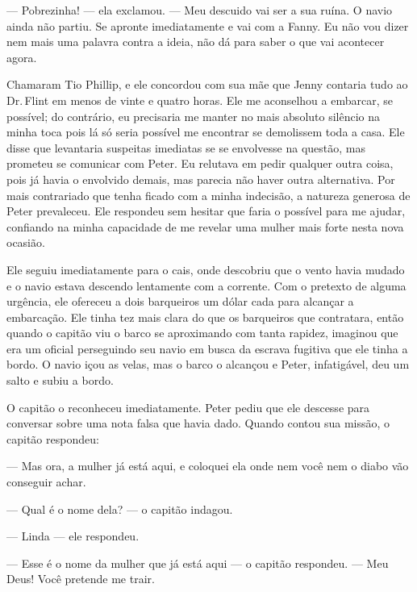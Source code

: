 --- Pobrezinha! --- ela exclamou. --- Meu descuido vai ser a sua ruína.
O navio ainda não partiu. Se apronte imediatamente e vai com a Fanny. Eu
não vou dizer nem mais uma palavra contra a ideia, não dá para saber o
que vai acontecer agora.

Chamaram Tio Phillip, e ele concordou
com sua mãe que Jenny contaria tudo ao Dr.\,Flint em menos de vinte e
quatro horas. Ele me aconselhou a embarcar, se possível; do contrário,
eu precisaria me manter no mais absoluto silêncio na minha toca pois lá
só seria possível me encontrar se demolissem toda a casa. Ele disse que
levantaria suspeitas imediatas se se envolvesse na questão, mas prometeu
se comunicar com Peter. Eu relutava em pedir qualquer outra coisa, pois
já havia o envolvido demais, mas parecia não haver outra alternativa.
Por mais contrariado que tenha ficado com a minha indecisão, a natureza
generosa de Peter prevaleceu. Ele respondeu sem hesitar que faria o
possível para me ajudar, confiando na minha capacidade de me revelar uma
mulher mais forte nesta nova ocasião.

Ele seguiu imediatamente para o cais,
onde descobriu que o vento havia mudado e o navio estava descendo
lentamente com a corrente. Com o pretexto de alguma urgência, ele
ofereceu a dois barqueiros um dólar cada para alcançar a embarcação. Ele
tinha tez mais clara do que os barqueiros que contratara, então quando o
capitão viu o barco se aproximando com tanta rapidez, imaginou que era
um oficial perseguindo seu navio em busca da escrava fugitiva que ele
tinha a bordo. O navio içou as velas, mas o barco o alcançou e Peter,
infatigável, deu um salto e subiu a bordo.

O capitão o reconheceu imediatamente.
Peter pediu que ele descesse para conversar sobre uma nota falsa que
havia dado. Quando contou sua missão, o capitão respondeu:

--- Mas ora, a mulher já está aqui, e coloquei ela onde nem você nem o
diabo vão conseguir achar.


--- Qual é o nome dela? --- o capitão
indagou.

--- Linda --- ele respondeu.

--- Esse é o nome da mulher que já está
aqui --- o capitão respondeu. --- Meu Deus! Você pretende me trair.

